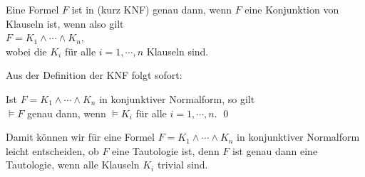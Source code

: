 \begin{Definition}  
  Eine Formel $F$ ist in  (kurz KNF)
  genau dann, wenn $F$ eine Konjunktion von Klauseln ist, wenn also gilt \\[0.2cm]
  \hspace*{1.3cm} $F = K_1 \wedge \cdots \wedge K_n$, \\[0.2cm]
  wobei die $K_i$ für alle $i=1,\cdots,n$ Klauseln sind. \eox
\end{Definition}

\noindent
Aus der Definition der KNF folgt sofort:
\begin{Korollar} \label{korollar:knf}
  Ist $F = K_1 \wedge \cdots \wedge K_n$ in konjunktiver Normalform, so gilt\\[0.2cm]
  \hspace*{1.3cm} $\models F$ \quad genau dann, wenn \quad $\models K_i$ \quad für alle $i=1,\cdots,n$. \qed
\end{Korollar}

Damit können wir für eine Formel $F = K_1 \wedge \cdots \wedge K_n$ in konjunktiver
Normalform leicht entscheiden, ob $F$ eine Tautologie ist, denn $F$ ist genau dann eine
Tautologie, wenn alle Klauseln $K_i$ trivial sind.
\vspace*{0.2cm}

